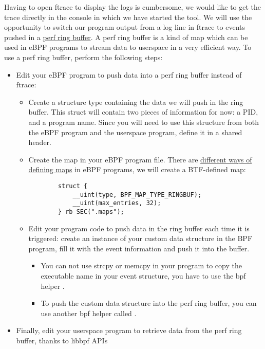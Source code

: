 Having to open ftrace to display the logs is cumbersome, we would like to get the trace directly in the console in which we have started the tool. We will use the opportunity to switch our program output from a log line in ftrace to events pushed in a \href{https://docs.kernel.org/6.6/bpf/ringbuf.html}{perf ring buffer}. A perf ring buffer is a kind of map which can be used in eBPF programs to stream data to userspace in a very efficient way. To use a perf ring buffer, perform the following steps:
\begin{itemize}
  \item Edit your eBPF program to push data into a perf ring buffer instead of ftrace:
  \begin{itemize}
    \item Create a structure type containing the data we will push in the ring buffer. This struct will contain two pieces of information for now: a PID, and a program name. Since you will need to use this structure from both the eBPF program and the userspace program, define it in a shared header.
    \item Create the map in your eBPF program file. There are \href{https://ebpf-docs.dylanreimerink.nl/linux/concepts/maps/}{different ways of defining maps} in eBPF programs, we will create a BTF-defined map:
    \begin{verbatim}
        struct {
            __uint(type, BPF_MAP_TYPE_RINGBUF);
            __uint(max_entries, 32);
        } rb SEC(".maps");
    \end{verbatim}
    \item Edit your program code to push data in the ring buffer each time it is triggered: create an instance of your custom data structure in the BPF program, fill it with the event information and push it into the buffer.
    \begin{itemize}
      \item You can not use strcpy or memcpy in your program to copy the
      executable name in your event structure, you have to use the bpf helper .
      \item To push the custom data structure into the perf ring buffer, you can use another bpf helper called .
    \end{itemize}
  \end{itemize}
  \item Finally, edit your userspace program to retrieve data from the perf ring buffer, thanks to libbpf APIs
  \begin{itemize}

\end{itemize}
\end{itemize}
